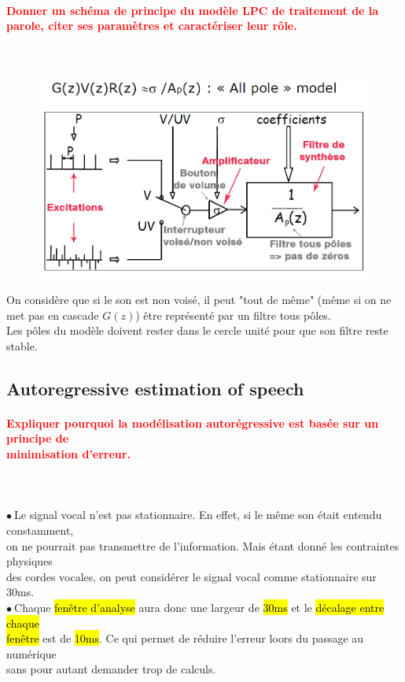 \documentclass[letterpaper, 12pt]{article}
\newcommand{\alinea}{
\hspace*{0.3cm}}
\newcommand{\red}[1]{
	\textcolor{red}{#1}
}
\newcommand{\point}{$\bullet\ $}
\begin{document}
		\paragraph{\red{Donner un schéma de principe du modèle LPC de traitement de la parole, citer ses paramètres 
		\hspace*{0.0325cm} et caractériser leur rôle.}}~\\
		\vspace*{-1cm}
		\begin{figure}[H]
			\centering
			\includegraphics[scale=0.5]{Images/lpc}
		\end{figure}\noindent
		\alinea On considère que si le son est non voisé, il peut "tout de même" (même si on ne met pas en cascade 
			$G(z)$) être représenté par un filtre tous pôles.\\
		\alinea Les pôles du mod\`ele doivent rester dans le cercle unité pour que son filtre reste stable.
		
	\subsection{Autoregressive estimation of speech}
		
		\paragraph{\red{Expliquer pourquoi la modélisation autorégressive est basée sur un principe de  
		~\\ \hspace*{0.035cm} minimisation d'erreur.}}~\\~\\
			\point Le signal vocal n'est pas stationnaire. En effet, si le même son était entendu constamment, 
				\\\alinea on ne pourrait pas transmettre de l'information. Mais étant donné les contraintes physiques
				\\\alinea des cordes vocales, on peut considérer le signal vocal comme stationnaire sur 30ms.\\
			\point Chaque \hl{fen\^etre d'analyse} aura donc une largeur de \hl{30ms} et le 
				\hl{d\'ecalage entre chaque } 
				\\\alinea \hl{fen\^etre} est de \hl{10ms}. Ce qui permet de réduire l'erreur loors du 
				passage au numérique 
				\\\alinea sans pour autant demander trop de calculs.
\end{document}
